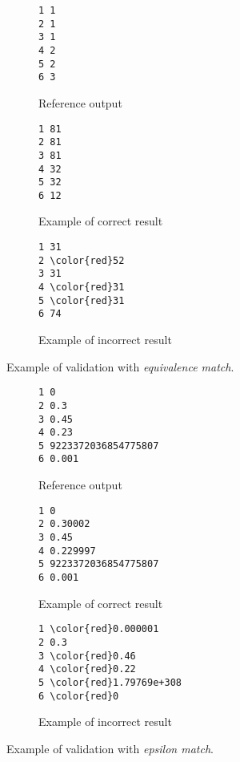 \begin{figure}[h]
\centering
\begin{subfigure}{0.3\textwidth}
\begin{Verbatim}[frame=single]
1 1
2 1
3 1
4 2
5 2
6 3
\end{Verbatim}
\caption{Reference output}
\end{subfigure}
\begin{subfigure}{0.3\textwidth}
\begin{Verbatim}[frame=single]
1 81
2 81
3 81
4 32
5 32
6 12
\end{Verbatim}
\caption{Example of correct result}
\end{subfigure}
\begin{subfigure}{0.3\textwidth}
\begin{Verbatim}[frame=single,commandchars=\\\{\}]
1 31
2 \color{red}52
3 31
4 \color{red}31
5 \color{red}31
6 74
\end{Verbatim}
\caption{Example of incorrect result}
\end{subfigure}
\caption{Example of validation with \emph{equivalence match}.}
\label{fig:definition_validation_equivalence}
\end{figure}


\begin{figure}[h]
\centering
\begin{subfigure}{0.3\textwidth}
\begin{Verbatim}[frame=single]
1 0
2 0.3
3 0.45
4 0.23
5 9223372036854775807
6 0.001
\end{Verbatim}
\caption{Reference output}
\end{subfigure}
\begin{subfigure}{0.3\textwidth}
\begin{Verbatim}[frame=single]
1 0
2 0.30002
3 0.45
4 0.229997
5 9223372036854775807
6 0.001
\end{Verbatim}
\caption{Example of correct result}
\end{subfigure}
\begin{subfigure}{0.3\textwidth}
\begin{Verbatim}[frame=single,commandchars=\\\{\}]
1 \color{red}0.000001
2 0.3
3 \color{red}0.46
4 \color{red}0.22
5 \color{red}1.79769e+308
6 \color{red}0
\end{Verbatim}
\caption{Example of incorrect result}
\end{subfigure}
\caption{Example of validation with \emph{epsilon match}.}
\label{fig:definition_validation_epsilon}
\end{figure}


